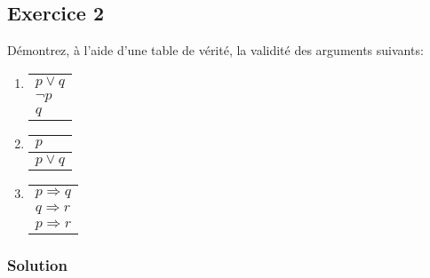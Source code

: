 \subsection*{Exercice 2}
Démontrez, à l'aide d'une table de vérité, la validité des arguments suivants:

\begin{enumerate}
	\item \enter
	
	\begin{flushleft}
	\begin{tabular}{l}
		$p \vee q$ \\
		$\neg p$ \\
	\hline
	$q$
	\end{tabular}
\end{flushleft}

	
	\item \enter
	
	\begin{flushleft}
	\begin{tabular}{l}
		$p$ \\
		\hline
	$p \vee q$
	\end{tabular}
	
\end{flushleft}

	\item \enter
	
	\begin{flushleft}
	\begin{tabular}{l}
		$p \Rightarrow q$ \\
		$q \Rightarrow r$ \\
	\hline
	$p \Rightarrow r$
	\end{tabular}
	
\end{flushleft}

\end{enumerate}

    \subsubsection*{Solution}
    
